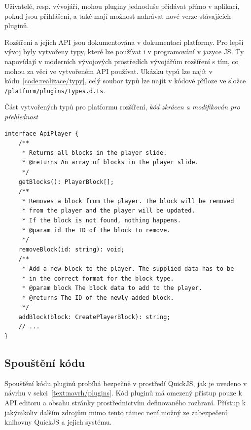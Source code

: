Uživatelé, resp. vývojáři, mohou pluginy jednoduše přidávat přímo v aplikaci, pokud jsou přihlášeni, a také mají možnost nahrávat nové verze stávajících pluginů. 

Rozšíření a jejich API jsou dokumentována v dokumentaci platformy.
Pro lepší vývoj byly vytvořeny typy, které lze používat i v programování v jazyce JS.
Ty napovídají v moderních vývojových prostředích vývojářům rozšíření s tím, co mohou za věci ve vytvořeném API používat.
Ukázku typů lze najít v kódu~\ref{code:realizace/typy}, celý soubor typů lze najít v kódové příloze ve složce \verb|/platform/plugins/types.d.ts|.


\begin{listing}[ht!]
\caption[Část vytvořených typů pro platformu rozšíření]{Část vytvořených typů pro platformu rozšíření, \textit{kód zkrácen a modifikován pro přehlednost}}\label{code:realizace/typy}
\begin{verbatim}
interface ApiPlayer {
    /**
     * Returns all blocks in the player slide.
     * @returns An array of blocks in the player slide.
     */
    getBlocks(): PlayerBlock[];
    /**
     * Removes a block from the player. The block will be removed 
     * from the player and the player will be updated.
     * If the block is not found, nothing happens.
     * @param id The ID of the block to remove.
     */
    removeBlock(id: string): void;
    /**
     * Add a new block to the player. The supplied data has to be
     * in the correct format for the block type.
     * @param block The block data to add to the player.
     * @returns The ID of the newly added block.
     */
    addBlock(block: CreatePlayerBlock): string;
    // ...
}
\end{verbatim}
\end{listing}

\subsection{Spouštění kódu}

Spouštění kódu pluginů probíhá bezpečně v prostředí QuickJS, jak je uvedeno v návrhu v sekci~\ref{text:navrh/plugins}. 
Kód pluginů má omezený přístup pouze k API editoru a obsahu stránky prostřednictvím definovaného rozhraní. 
Přístup k jakýmkoliv dalším zdrojům mimo tento rámec není možný ze zabezpečení knihovny QuickJS a jejich systému.

